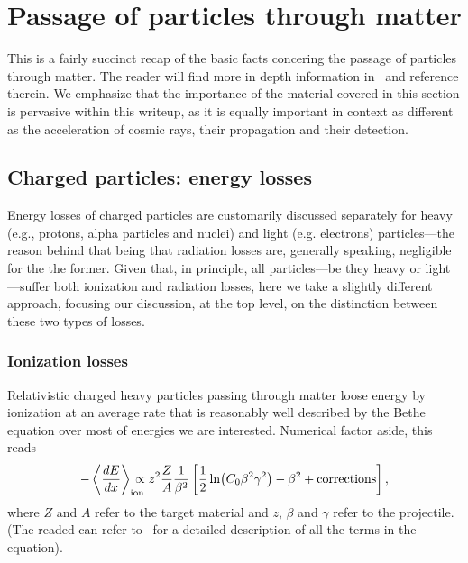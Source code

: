 \chapter{Passage of particles through matter}

This is a fairly succinct recap of the basic facts concering the passage of
particles through matter. The reader will find more in depth information
in~\cite{PDG} and reference therein. We emphasize that the importance of the
material covered in this section is pervasive within this writeup, as it is
equally important in context as different as the acceleration of cosmic rays,
their propagation and their detection.


\section{Charged particles: energy losses}

Energy losses of charged particles are customarily discussed separately for
heavy (e.g., protons, alpha particles and nuclei) and light
(e.g. electrons) particles---the reason behind that being that radiation losses
are, generally speaking, negligible for the the former. Given that, in principle, all
particles---be they heavy or light---suffer both ionization and radiation
losses, here we take a slightly different approach, focusing our discussion,
at the top level, on the distinction between these two types of losses.


\subsection{Ionization losses}

Relativistic charged heavy particles passing through matter loose energy by
ionization at an average rate that is reasonably well described by the Bethe
equation over most of energies we are interested. Numerical factor aside, this
reads
\begin{align}\label{eq:stopping_power}
  -\left<\frac{dE}{dx}\right>_\text{ion} \!\!\!\!\!\!
  \propto z^2 \frac{Z}{A}\frac{1}{\beta^2}
  \left[ \frac{1}{2} \ln(C_0 \beta^2\gamma^2) - \beta^2 +
    \text{corrections} \right],
\end{align}
where $Z$ and $A$ refer to the target material and $z$, $\beta$ and $\gamma$
refer to the projectile. (The readed can refer to~\cite{PDG} for a detailed
description of all the terms in the equation).

